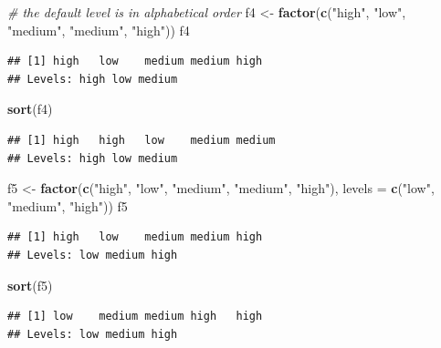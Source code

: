 \documentclass[]{book}
\newenvironment{Shaded}{\begin{snugshade}}{\end{snugshade}}
\newcommand{\CommentTok}[1]{\textcolor[rgb]{0.56,0.35,0.01}{\textit{#1}}}
\newcommand{\DataTypeTok}[1]{\textcolor[rgb]{0.13,0.29,0.53}{#1}}
\newcommand{\KeywordTok}[1]{\textcolor[rgb]{0.13,0.29,0.53}{\textbf{#1}}}
\newcommand{\NormalTok}[1]{#1}
\newcommand{\StringTok}[1]{\textcolor[rgb]{0.31,0.60,0.02}{#1}}
\begin{document}
\begin{Shaded}
\begin{Highlighting}[]
\CommentTok{# the default level is in alphabetical order }
\NormalTok{f4 <-}\StringTok{ }\KeywordTok{factor}\NormalTok{(}\KeywordTok{c}\NormalTok{(}\StringTok{"high"}\NormalTok{, }\StringTok{"low"}\NormalTok{, }\StringTok{"medium"}\NormalTok{, }\StringTok{"medium"}\NormalTok{, }\StringTok{"high"}\NormalTok{))}
\NormalTok{f4}
\end{Highlighting}
\end{Shaded}

\begin{verbatim}
## [1] high   low    medium medium high  
## Levels: high low medium
\end{verbatim}

\begin{Shaded}
\begin{Highlighting}[]
\KeywordTok{sort}\NormalTok{(f4)}
\end{Highlighting}
\end{Shaded}

\begin{verbatim}
## [1] high   high   low    medium medium
## Levels: high low medium
\end{verbatim}

\begin{Shaded}
\begin{Highlighting}[]
\NormalTok{f5 <-}\StringTok{ }\KeywordTok{factor}\NormalTok{(}\KeywordTok{c}\NormalTok{(}\StringTok{"high"}\NormalTok{, }\StringTok{"low"}\NormalTok{, }\StringTok{"medium"}\NormalTok{, }\StringTok{"medium"}\NormalTok{, }\StringTok{"high"}\NormalTok{), }\DataTypeTok{levels =} \KeywordTok{c}\NormalTok{(}\StringTok{"low"}\NormalTok{, }\StringTok{"medium"}\NormalTok{, }\StringTok{"high"}\NormalTok{))}
\NormalTok{f5}
\end{Highlighting}
\end{Shaded}

\begin{verbatim}
## [1] high   low    medium medium high  
## Levels: low medium high
\end{verbatim}

\begin{Shaded}
\begin{Highlighting}[]
\KeywordTok{sort}\NormalTok{(f5)}
\end{Highlighting}
\end{Shaded}

\begin{verbatim}
## [1] low    medium medium high   high  
## Levels: low medium high
\end{verbatim}
\end{document}
